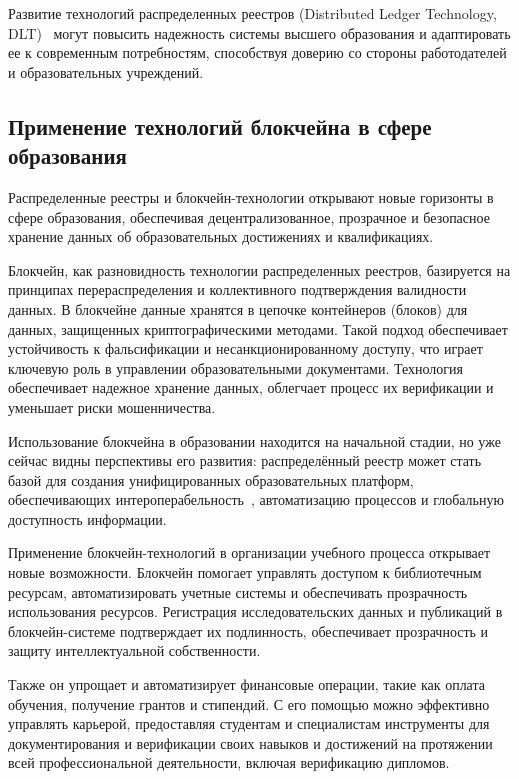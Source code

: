 Развитие технологий распределенных реестров (Distributed Ledger Technology, DLT)~\cite{bib:distributed_ledger} могут повысить надежность системы высшего образования и адаптировать ее к современным потребностям, способствуя доверию со стороны работодателей и образовательных учреждений.

\subsection{Применение технологий блокчейна в сфере образования}

Распределенные реестры и блокчейн-технологии открывают новые горизонты в сфере образования, обеспечивая децентрализованное, прозрачное и безопасное хранение данных об образовательных достижениях и квалификациях.

Блокчейн, как разновидность технологии распределенных реестров, базируется на принципах перераспределения и коллективного подтверждения валидности данных. В блокчейне данные хранятся в цепочке контейнеров (блоков) для данных, защищенных криптографическими методами. Такой подход обеспечивает устойчивость к фальсификации и несанкционированному доступу, что играет ключевую роль в управлении образовательными документами. Технология обеспечивает надежное хранение данных, облегчает процесс их верификации и уменьшает риски мошенничества.~\cite{bib:blockchain_technology}

Использование блокчейна в образовании находится на начальной стадии, но уже сейчас видны перспективы его развития: распределённый реестр может стать базой для создания унифицированных образовательных платформ, обеспечивающих интероперабельность~\cite{bib:interoperability}, автоматизацию процессов и глобальную доступность информации.

Применение блокчейн-технологий в организации учебного процесса открывает новые возможности. Блокчейн помогает управлять доступом к библиотечным ресурсам, автоматизировать учетные системы и обеспечивать прозрачность использования ресурсов. Регистрация исследовательских данных и публикаций в блокчейн-системе подтверждает их подлинность, обеспечивает прозрачность и защиту интеллектуальной собственности.

Также он упрощает и автоматизирует финансовые операции, такие как оплата обучения, получение грантов и стипендий. С его помощью можно эффективно управлять карьерой, предоставляя студентам и специалистам инструменты для документирования и верификации своих навыков и достижений на протяжении всей профессиональной деятельности, включая верификацию дипломов.

